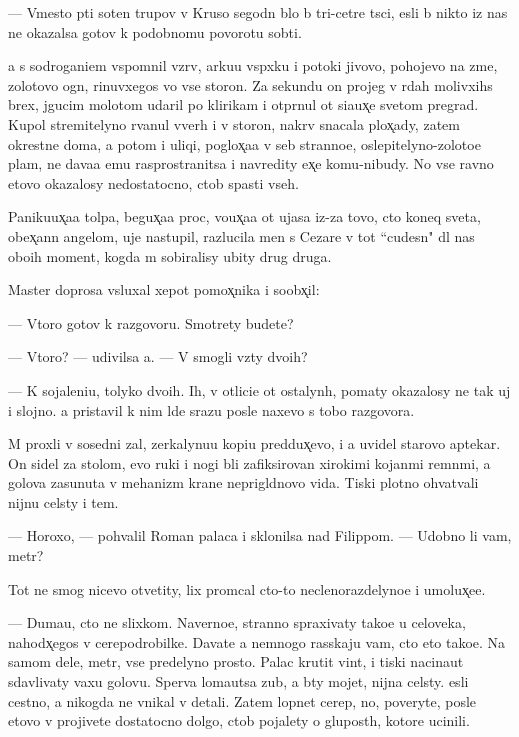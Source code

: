 \documentclass[10pt]{book}
\begin{document}
— Vmesto p{\ia}ti soten trupov v Kruso segodn{\ia} b{\yi}lo b{\yi} tri-cet{\yi}re t{\yi}s{\ia}ci, {\y}esli b{\yi} nikto iz nas ne okazalsa gotov k podobnomu povorotu sob{\yi}ti{\y}.

{\Y}a s sodrogani{\y}em vspomnil vzr{\yi}v, {\y}arku{\y}u vsp{\yi}xku i potoki jivovo, pohojevo na zme{\y}, zolotovo ogn{\ia}, rinuvxegos{\ia} vo vse storon{\yi}. Za sekundu on projeg v r{\ia}dah molivxihs{\ia} brex, jgucim molotom udaril po klirikam i otpr{\ia}nul ot si{\y}a{\y}ux̨e{\y} svetom pregrad{\yi}. Kupol stremitelyno rvanul vverh i v storon{\yi}, nakr{\yi}v snacala plox̨ady, zatem okrestn{\yi}{\y}e doma, a potom i uliqi, poglox̨a{\y}a v seb{\ia} stranno{\y}e, oslepitelyno-zoloto{\y}e plam{\ia}, ne dava{\y}a {\y}emu rasprostranitsa i navredity {\y}ex̨e komu-nibudy. No vse ravno etovo okazalosy nedostatocno, ctob{\yi} spasti vseh.

Paniku{\y}ux̨a{\y}a tolpa, begux̨a{\y}a proc, vo{\y}ux̨a{\y}a ot ujasa iz-za tovo, cto koneq sveta, obex̨ann{\yi}{\y} angelom, uje nastupil, razlucila men{\ia} s Cezare v tot ``cudesn{\yi}{\y}" dl{\ia} nas obo{\y}ih moment, kogda m{\yi} sobiralisy ubity drug druga.

Master doprosa v{\yi}sluxal xepot pomox̨nika i soobx̨il:

— Vtoro{\y} gotov k razgovoru. Smotrety budete?

— Vtoro{\y}? — udivilsa {\y}a. — V{\yi} smogli vz{\ia}ty dvo{\y}ih?

— K sojaleni{\y}u, tolyko dvo{\y}ih. Ih, v otlici{\y}e ot ostalyn{\yi}h, po{\y}maty okazalosy ne tak uj i slojno. {\Y}a pristavil k nim l{\iu}de{\y} srazu posle naxevo s tobo{\y} razgovora.

M{\yi} proxli v sosedni{\y} zal, zerkalynu{\y}u kopi{\y}u pred{\yi}dux̨evo, i {\y}a uvidel starovo aptekar{\ia}. On sidel za stolom, {\y}evo ruki i nogi b{\yi}li zafiksirovan{\yi} xirokimi kojan{\yi}mi remn{\ia}mi, a golova zasunuta v mehanizm kra{\y}ne neprigl{\ia}dnovo vida. Tiski plotno ohvat{\yi}vali nijn{\iu}{\y}u cel{\iu}sty i tem{\ia}.

— Horoxo, — pohvalil Roman palaca i sklonilsa nad Filippom. — Udobno li vam, metr?

Tot ne smog nicevo otvetity, lix prom{\yi}cal cto-to neclenorazdelyno{\y}e i umol{\ia}{\y}ux̨e{\y}e.

— Duma{\y}u, cto ne slixkom. Naverno{\y}e, stranno spraxivaty tako{\y}e u celoveka, nahod{\ia}x̨egos{\ia} v cerepodrobilke. Dava{\y}te {\y}a nemnogo rasskaju vam, cto eto tako{\y}e. Na samom dele, metr, vse predelyno prosto. Palac krutit vint, i tiski nacina{\y}ut sdavlivaty vaxu golovu. Sperva loma{\y}utsa zub{\yi}, a b{\yi}ty mojet, nijn{\ia}{\y}a cel{\iu}sty. {\Y}esli cestno, {\y}a nikogda ne vnikal v detali. Zatem lopnet cerep, no, poveryte, posle etovo v{\yi} projivete dostatocno dolgo, ctob{\yi} pojalety o glupost{\ia}h, kotor{\yi}{\y}e ucinili.
\end{document}
